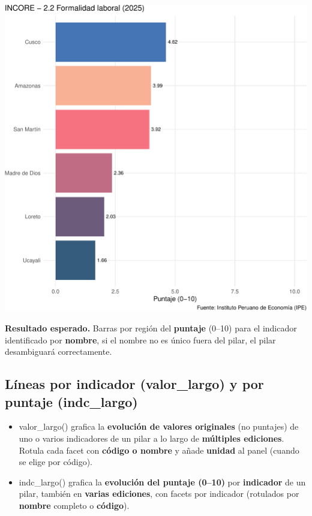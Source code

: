 \documentclass[
  11pt,
  letterpaper,
  DIV=11,
  numbers=noendperiod]{scrartcl}
\begin{document}
\includegraphics{Manual_files/figure-pdf/unnamed-chunk-77-1.pdf}

\textbf{Resultado esperado.} Barras por región del \textbf{puntaje}
(0--10) para el indicador identificado por \textbf{nombre}, si el nombre
no es único fuera del pilar, el pilar desambiguará correctamente.

\subsection{\texorpdfstring{\textbf{Líneas por indicador (valor\_largo)
y por puntaje
(indc\_largo)}}{Líneas por indicador (valor\_largo) y por puntaje (indc\_largo)}}\label{luxedneas-por-indicador-valor_largo-y-por-puntaje-indc_largo}

\begin{itemize}
\item
  valor\_largo() grafica la \textbf{evolución de valores originales} (no
  puntajes) de uno o varios indicadores de un pilar a lo largo de
  \textbf{múltiples ediciones}. Rotula cada facet con \textbf{código o
  nombre} y añade \textbf{unidad} al panel (cuando se elige por código).
\item
  indc\_largo() grafica la \textbf{evolución del puntaje (0--10)} por
  \textbf{indicador} de un pilar, también en \textbf{varias ediciones},
  con facets por indicador (rotulados por \textbf{nombre} completo o
  \textbf{código}).
\end{itemize}
\end{document}

